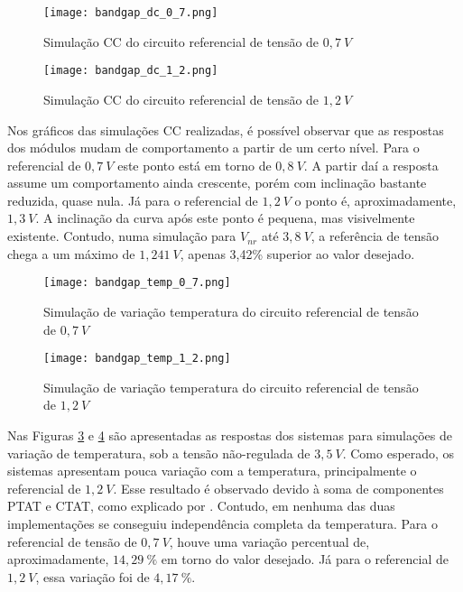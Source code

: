 \begin{figure}[!htb]
	\caption{\label{fig:bandgap_dc_0_7}Simulação {CC} do circuito referencial de tensão de $0,7~V$}
	\begin{center}
		\texttt{[image: bandgap\_dc\_0\_7.png]}
	\end{center}
\end{figure}

\begin{figure}[!htb]
	\caption{\label{fig:bandgap_dc_1_2}Simulação {CC} do circuito referencial de tensão de $1,2~V$}
	\begin{center}
		\texttt{[image: bandgap\_dc\_1\_2.png]}
	\end{center}
\end{figure}

Nos gráficos das simulações {CC} realizadas, é possível observar que as respostas dos módulos mudam de comportamento a partir de um certo nível. Para o referencial de $0,7~V$ este ponto está em torno de $0,8~V$. A partir daí a resposta assume um comportamento ainda crescente, porém com inclinação bastante reduzida, quase nula. Já para o referencial de $1,2~V$ o ponto é, aproximadamente, $1,3~V$. A inclinação da curva após este ponto é pequena, mas visivelmente existente. Contudo, numa simulação para $V_{nr}$ até $3,8~V$, a referência de tensão chega a um máximo de $1,241~V$, apenas 3,42\% superior ao valor desejado.

\begin{figure}[!htb]
	\caption{\label{fig:bandgap_temp_0_7}Simulação de variação temperatura do circuito referencial de tensão de $0,7~V$}
	\begin{center}
		\texttt{[image: bandgap\_temp\_0\_7.png]}
	\end{center}
\end{figure}

\begin{figure}[!htb]
	\caption{\label{fig:bandgap_temp_1_2}Simulação de variação temperatura do circuito referencial de tensão de $1,2~V$}
	\begin{center}
		\texttt{[image: bandgap\_temp\_1\_2.png]}
	\end{center}
\end{figure}

Nas Figuras \ref{fig:bandgap_temp_0_7} e \ref{fig:bandgap_temp_1_2} são apresentadas as respostas dos sistemas para simulações de variação de temperatura, sob a tensão não-regulada de $3,5~V$. Como esperado, os sistemas apresentam pouca variação com a temperatura, principalmente o referencial de $1,2~V$. Esse resultado é observado devido à soma de componentes {PTAT} e {CTAT}, como explicado por . Contudo, em nenhuma das duas implementações se conseguiu independência completa da temperatura. Para o referencial de tensão de $0,7~V$, houve uma variação percentual de, aproximadamente, $14,29~\%$ em torno do valor desejado. Já para o referencial de $1,2~V$, essa variação foi de $4,17~\%$.

